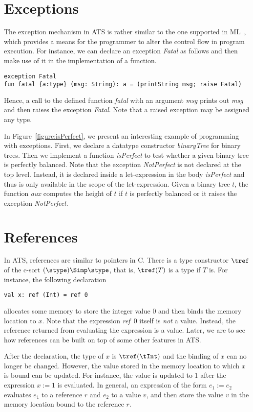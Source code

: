 \section{Exceptions}
The exception mechanism in ATS is rather similar to the one supported in
ML~\cite{SML97}, which provides a means for the programmer to alter the
control flow in program execution. For instance, we can declare an
exception {\em Fatal} as follows and then make use of it in the
implementation of a function.
\begin{verbatim}
exception Fatal
fun fatal {a:type} (msg: String): a = (printString msg; raise Fatal)
\end{verbatim}
Hence, a call to the defined function {\it fatal} with an argument {\it
msg} prints out {\it msg} and then raises the exception {\it Fatal}.  Note
that a raised exception may be assigned any type.

In Figure~\ref{figure:isPerfect}, we present an interesting example of
programming with exceptions. First, we declare a datatype constructor {\it
binaryTree} for binary trees. Then we implement a function {\it isPerfect}
to test whether a given binary tree is perfectly balanced.  Note that the
exception {\it NotPerfect} is not declared at the top level. Instead, it is
declared inside a let-expression in the body {\it isPerfect} and thus is
only available in the scope of the let-expression. Given a binary tree $t$,
the function {\it aux} computes the height of $t$ if $t$ is perfectly
balanced or it raises the exception {\it NotPerfect}.

\def\fref{{\it ref}}
\section{References}\label{section:reference}
In ATS, references are similar to pointers in C.
There is a type constructor $\tref$ of the c-sort $(\stype)\Simp\stype$,
that is, $\tref(T)$ is a type if $T$ is.
For instance, the
following declaration
\begin{verbatim}
val x: ref (Int) = ref 0
\end{verbatim}
allocates some memory to store the integer value $0$ and then binds the
memory location to $x$. Note that the expression {\fref~0} itself is {\em
not} a value. Instead, the reference returned from evaluating the
expression is a value. Later, we are to see how references can be built on
top of some other features in ATS.

After the declaration, the type of $x$ is $\tref(\tInt)$ and the binding of
$x$ can no longer be changed.  However, the value stored in the memory
location to which $x$ is bound can be updated. For instance, the value is
updated to $1$ after the expression $x := 1$ is evaluated. In general, an
expression of the form $e_1 := e_2$ evaluates $e_1$ to a reference $r$ and
$e_2$ to a value $v$, and then store the value $v$ in the memory location
bound to the reference $r$.

